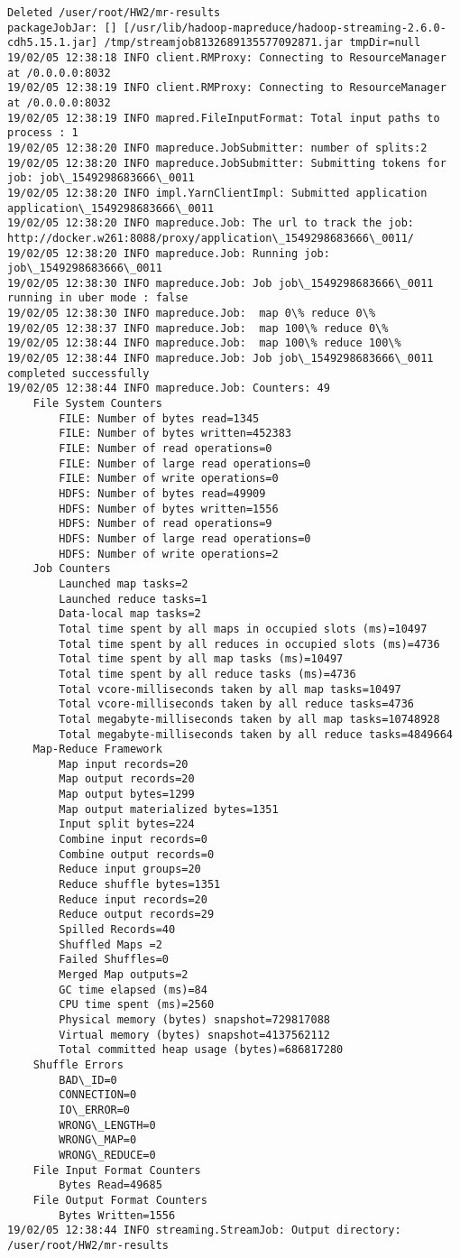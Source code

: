 \documentclass[11pt]{article}
\begin{document}
    \begin{Verbatim}[commandchars=\\\{\}]
Deleted /user/root/HW2/mr-results
packageJobJar: [] [/usr/lib/hadoop-mapreduce/hadoop-streaming-2.6.0-cdh5.15.1.jar] /tmp/streamjob8132689135577092871.jar tmpDir=null
19/02/05 12:38:18 INFO client.RMProxy: Connecting to ResourceManager at /0.0.0.0:8032
19/02/05 12:38:19 INFO client.RMProxy: Connecting to ResourceManager at /0.0.0.0:8032
19/02/05 12:38:19 INFO mapred.FileInputFormat: Total input paths to process : 1
19/02/05 12:38:20 INFO mapreduce.JobSubmitter: number of splits:2
19/02/05 12:38:20 INFO mapreduce.JobSubmitter: Submitting tokens for job: job\_1549298683666\_0011
19/02/05 12:38:20 INFO impl.YarnClientImpl: Submitted application application\_1549298683666\_0011
19/02/05 12:38:20 INFO mapreduce.Job: The url to track the job: http://docker.w261:8088/proxy/application\_1549298683666\_0011/
19/02/05 12:38:20 INFO mapreduce.Job: Running job: job\_1549298683666\_0011
19/02/05 12:38:30 INFO mapreduce.Job: Job job\_1549298683666\_0011 running in uber mode : false
19/02/05 12:38:30 INFO mapreduce.Job:  map 0\% reduce 0\%
19/02/05 12:38:37 INFO mapreduce.Job:  map 100\% reduce 0\%
19/02/05 12:38:44 INFO mapreduce.Job:  map 100\% reduce 100\%
19/02/05 12:38:44 INFO mapreduce.Job: Job job\_1549298683666\_0011 completed successfully
19/02/05 12:38:44 INFO mapreduce.Job: Counters: 49
	File System Counters
		FILE: Number of bytes read=1345
		FILE: Number of bytes written=452383
		FILE: Number of read operations=0
		FILE: Number of large read operations=0
		FILE: Number of write operations=0
		HDFS: Number of bytes read=49909
		HDFS: Number of bytes written=1556
		HDFS: Number of read operations=9
		HDFS: Number of large read operations=0
		HDFS: Number of write operations=2
	Job Counters 
		Launched map tasks=2
		Launched reduce tasks=1
		Data-local map tasks=2
		Total time spent by all maps in occupied slots (ms)=10497
		Total time spent by all reduces in occupied slots (ms)=4736
		Total time spent by all map tasks (ms)=10497
		Total time spent by all reduce tasks (ms)=4736
		Total vcore-milliseconds taken by all map tasks=10497
		Total vcore-milliseconds taken by all reduce tasks=4736
		Total megabyte-milliseconds taken by all map tasks=10748928
		Total megabyte-milliseconds taken by all reduce tasks=4849664
	Map-Reduce Framework
		Map input records=20
		Map output records=20
		Map output bytes=1299
		Map output materialized bytes=1351
		Input split bytes=224
		Combine input records=0
		Combine output records=0
		Reduce input groups=20
		Reduce shuffle bytes=1351
		Reduce input records=20
		Reduce output records=29
		Spilled Records=40
		Shuffled Maps =2
		Failed Shuffles=0
		Merged Map outputs=2
		GC time elapsed (ms)=84
		CPU time spent (ms)=2560
		Physical memory (bytes) snapshot=729817088
		Virtual memory (bytes) snapshot=4137562112
		Total committed heap usage (bytes)=686817280
	Shuffle Errors
		BAD\_ID=0
		CONNECTION=0
		IO\_ERROR=0
		WRONG\_LENGTH=0
		WRONG\_MAP=0
		WRONG\_REDUCE=0
	File Input Format Counters 
		Bytes Read=49685
	File Output Format Counters 
		Bytes Written=1556
19/02/05 12:38:44 INFO streaming.StreamJob: Output directory: /user/root/HW2/mr-results

    \end{Verbatim}
\end{document}
